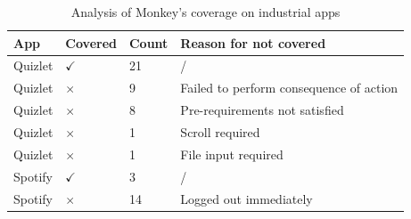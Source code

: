 \documentclass[conference]{IEEEtran}
\begin{document}
\begin{table}
    \centering
    \caption{Analysis of Monkey's coverage on industrial apps}
    \label{tab:monkey_cover}
    \begin{tabular}{|l|l|l|l|}
    \hline
    \textbf{App} & \textbf{Covered}    & \textbf{Count} & \textbf{Reason for not covered}         \\ \hline
    Quizlet           & $\checkmark$ & 21             & /                                       \\ \hline
    Quizlet           & $\times$     & 9              & Failed to perform consequence of action \\ \hline
    Quizlet           & $\times$     & 8              & Pre-requirements not satisfied          \\ \hline
    Quizlet           & $\times$     & 1              & Scroll required                         \\ \hline
    Quizlet           & $\times$     & 1              & File input required                     \\ \hline
    Spotify           & $\checkmark$ & 3              & /                                       \\ \hline
    Spotify           & $\times$     & 14             & Logged out immediately                  \\ \hline
    \end{tabular}
    \end{table}
\end{document}

